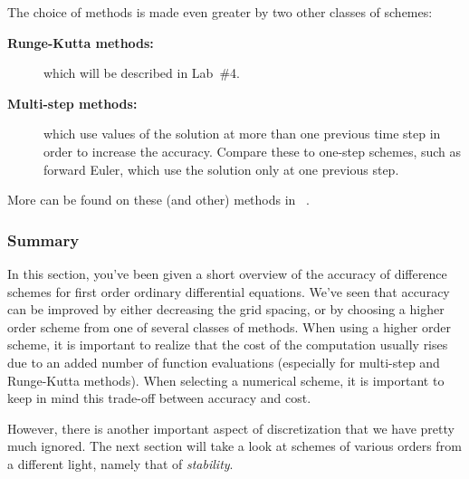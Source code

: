 The choice of methods is made even greater by two other classes of
schemes:
\begin{description}
\item[\textbf{ Runge-Kutta methods:}]  which will be described in
  Lab~\#4.  
\item[\textbf{ Multi-step methods:}] which use values of the solution at
  more than one previous time step in order to increase the accuracy.
  Compare these to one-step schemes, such as forward 
  Euler, which use the solution only at one previous step. 
\end{description}
More can be found on these (and other) methods in ~\cite{burden-faires}. 

\subsubsection{Summary}

In this section, you've been given a short overview of the accuracy of
difference schemes for first order ordinary differential equations.
We've seen that accuracy can be improved by either decreasing the grid
spacing, or by choosing a higher order scheme from one of several
classes of methods.
When using a higher order scheme, it is important to realize
that the cost of the computation usually rises due to an added
number of function evaluations (especially for multi-step and
Runge-Kutta methods).   
When selecting a numerical scheme, it is important to keep in mind this
trade-off between accuracy and cost.

However, there is another important aspect of discretization that we
have pretty much ignored.  
The next section will take a look at schemes of various orders from
a different light, namely that of \emph{ stability}.

\begin{latexonly}
\end{latexonly}

